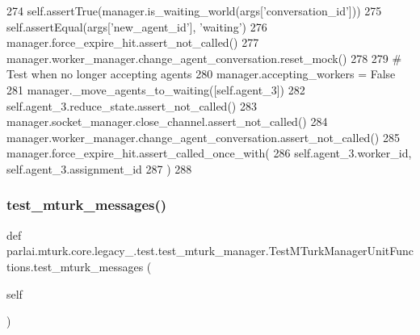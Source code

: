 \begin{DoxyCode}
274         self.assertTrue(manager.is\_waiting\_world(args[\textcolor{stringliteral}{'conversation\_id'}]))
275         self.assertEqual(args[\textcolor{stringliteral}{'new\_agent\_id'}], \textcolor{stringliteral}{'waiting'})
276         manager.force\_expire\_hit.assert\_not\_called()
277         manager.worker\_manager.change\_agent\_conversation.reset\_mock()
278 
279         \textcolor{comment}{# Test when no longer accepting agents}
280         manager.accepting\_workers = \textcolor{keyword}{False}
281         manager.\_move\_agents\_to\_waiting([self.agent\_3])
282         self.agent\_3.reduce\_state.assert\_not\_called()
283         manager.socket\_manager.close\_channel.assert\_not\_called()
284         manager.worker\_manager.change\_agent\_conversation.assert\_not\_called()
285         manager.force\_expire\_hit.assert\_called\_once\_with(
286             self.agent\_3.worker\_id, self.agent\_3.assignment\_id
287         )
288 
\end{DoxyCode}
\mbox{\label{classparlai_1_1mturk_1_1core_1_1legacy__2018_1_1test_1_1test__mturk__manager_1_1TestMTurkManagerUnitFunctions_a0b9b38ea768c11162c399fbf98c9dcf6}} 
\subsubsection{\texorpdfstring{test\+\_\+mturk\+\_\+messages()}{test\_mturk\_messages()}}
{\footnotesize\ttfamily def parlai.\+mturk.\+core.\+legacy\+\_.\+test.\+test\+\_\+mturk\+\_\+manager.\+Test\+M\+Turk\+Manager\+Unit\+Functions.\+test\+\_\+mturk\+\_\+messages (\begin{DoxyParamCaption}\item[{}]{self }\end{DoxyParamCaption})}

